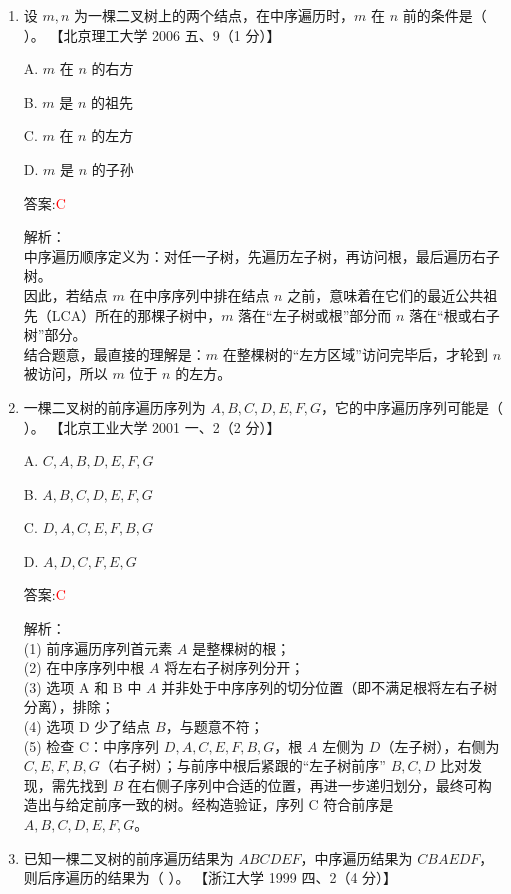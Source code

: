 \documentclass[lang=cn,newtx,10pt,scheme=chinese]{../../../elegantbook}
\begin{document}
\begin{enumerate}
\item 设 $m, n$ 为一棵二叉树上的两个结点，在中序遍历时，$m$ 在 $n$ 前的条件是（ ）。  
    【北京理工大学 2006 五、9（1 分）】

    A. $m$ 在 $n$ 的右方

    B. $m$ 是 $n$ 的祖先

    C. $m$ 在 $n$ 的左方

    D. $m$ 是 $n$ 的子孙

    答案:\textcolor{red}{C}

    解析：\\
    中序遍历顺序定义为：对任一子树，先遍历左子树，再访问根，最后遍历右子树。\\
    因此，若结点 $m$ 在中序序列中排在结点 $n$ 之前，意味着在它们的最近公共祖先（LCA）所在的那棵子树中，$m$ 落在“左子树或根”部分而 $n$ 落在“根或右子树”部分。\\
    结合题意，最直接的理解是：$m$ 在整棵树的“左方区域”访问完毕后，才轮到 $n$ 被访问，所以 $m$ 位于 $n$ 的左方。\\

\item 一棵二叉树的前序遍历序列为 $A, B, C, D, E, F, G$，它的中序遍历序列可能是（ ）。  
    【北京工业大学 2001 一、2（2 分）】

    A. $C, A, B, D, E, F, G$

    B. $A, B, C, D, E, F, G$

    C. $D, A, C, E, F, B, G$

    D. $A, D, C, F, E, G$

    答案:\textcolor{red}{C}

    解析：\\
    (1) 前序遍历序列首元素 $A$ 是整棵树的根；\\
    (2) 在中序序列中根 $A$ 将左右子树序列分开；\\
    (3) 选项 A 和 B 中 $A$ 并非处于中序序列的切分位置（即不满足根将左右子树分离），排除；\\
    (4) 选项 D 少了结点 $B$，与题意不符；\\
    (5) 检查 C：中序序列 $D, A, C, E, F, B, G$，根 $A$ 左侧为 $D$（左子树），右侧为 $C, E, F, B, G$（右子树）；与前序中根后紧跟的“左子树前序” $B, C, D$ 比对发现，需先找到 $B$ 在右侧子序列中合适的位置，再进一步递归划分，最终可构造出与给定前序一致的树。经构造验证，序列 C 符合前序是 $A,B,C,D,E,F,G$。\\

\item 已知一棵二叉树的前序遍历结果为 $ABCDEF$，中序遍历结果为 $CBAEDF$，则后序遍历的结果为（ ）。  
    【浙江大学 1999 四、2（4 分）】


\end{enumerate}
\end{document}
